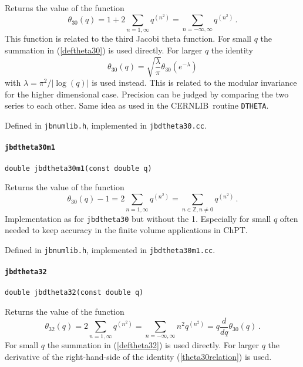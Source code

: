 \documentclass[12pt,a4paper]{article}
\newcommand{\mytt}[1]{\texttt{#1}}
\newcommand{\newfunction}[1]{\mytt{#1}\index{\mytt{#1}}}
\newcommand{\cernlib}{\textsc{CERNLIB}\cite{cernlib}}
\begin{document}
Returns the value of the function
\begin{equation}
\label{deftheta30}
\theta_{30}(q) = 1+2\sum_{n=1,\infty} q^{(n^2)}
= \sum_{n=-\infty,\infty} q^{(n^2)}\,.
\end{equation}
This function is related to the third Jacobi theta function.
For small $q$ the summation in (\ref{deftheta30}) is used directly.
For larger $q$ the identity
\begin{equation}
\label{theta30relation}
\theta_{30}(q) = \sqrt{\frac{\lambda}{\pi}}\theta_{30}\left(e^{-\lambda}\right)
\end{equation}
with $\lambda = \pi^2/|\log(q)|$ is used instead.
This is related to the modular invariance for the higher dimensional case.
Precision can be judged by comparing the two series to each other.
Same idea as used in the \cernlib\ routine \mytt{DTHETA}.

Defined in \mytt{jbnumlib.h}, implemented in \mytt{jbdtheta30.cc}.

\paragraph{\newfunction{jbdtheta30m1}}

\mytt{double jbdtheta30m1(const double q)}

Returns the value of the function
\begin{equation}
\label{deftheta30m1}
\theta_{30}(q)-1 = 2\sum_{n=1,\infty} q^{(n^2)}
=\sum_{n\in\mathbb{Z},n\ne0} q^{(n^2)}\,.
\end{equation}
Implementation as for \mytt{jbdtheta30} but without the 1.
Especially for small $q$ often needed to keep accuracy in the finite volume
applications in ChPT.

Defined in \mytt{jbnumlib.h}, implemented in \mytt{jbdtheta30m1.cc}.

\paragraph{\newfunction{jbdtheta32}}

\mytt{double jbdtheta32(const double q)}

Returns the value of the function
\begin{equation}
\label{deftheta32}
\theta_{32}(q) = 2\sum_{n=1,\infty} q^{(n^2)}
= \sum_{n=-\infty,\infty}n^2 q^{(n^2)}= q\frac{d}{dq}\theta_{30}(q)\,.
\end{equation}
For small $q$ the summation in (\ref{deftheta32}) is used directly.
For larger $q$ the derivative of the right-hand-side of the
identity (\ref{theta30relation}) is used.
\end{document}
